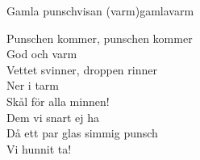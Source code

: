 \begin{song}{Gamla punschvisan (varm)}{gamlavarm}
\begin{vers}
Punschen kommer, punschen kommer\\
God och varm\\
Vettet svinner, droppen rinner\\
Ner i tarm\\
Skål för alla minnen!\\
Dem vi snart ej ha\\
Då ett par glas simmig punsch\\
Vi hunnit ta!\\
\end{vers}
\end{song}
